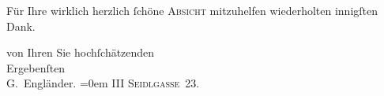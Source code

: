 \pstart
           Für Ihre wirklich herzlich{ }ſchöne \textsc{Absicht} mitzuhelfen
               wiederholten innigſten Dank.\pend
           
\pstart
           von Ihren Sie hochſchätzenden{\\[\baselineskip]}Ergebenſten{\\[\baselineskip]}\spacefill\mbox{G. Engländer.}\pend
           \leftskip=0em{}
\pstart
           \noindent{}\textsc{III Seidlgasse 23.}\pend
           \endnumbering{}  \newcommand{\dateiname}{L02123}\newcommand{\titel}{Georg Engländer an Arthur Schnitzler, 18. 4. 1913}\newcommand{\editorInnen}{Martin Anton Müller und Gerd-Hermann Susen}
